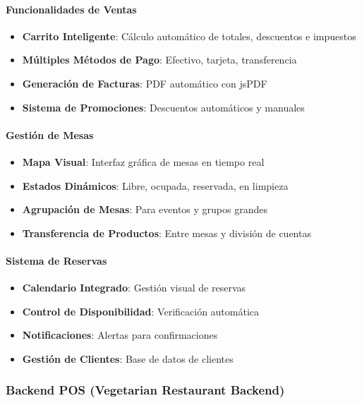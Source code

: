 \documentclass[12pt,a4paper]{article}
\begin{document}
\paragraph{Funcionalidades de Ventas}
\begin{itemize}
    \item \textbf{Carrito Inteligente}: Cálculo automático de totales, descuentos e impuestos
    \item \textbf{Múltiples Métodos de Pago}: Efectivo, tarjeta, transferencia
    \item \textbf{Generación de Facturas}: PDF automático con jsPDF
    \item \textbf{Sistema de Promociones}: Descuentos automáticos y manuales
\end{itemize}

\paragraph{Gestión de Mesas}
\begin{itemize}
    \item \textbf{Mapa Visual}: Interfaz gráfica de mesas en tiempo real
    \item \textbf{Estados Dinámicos}: Libre, ocupada, reservada, en limpieza
    \item \textbf{Agrupación de Mesas}: Para eventos y grupos grandes
    \item \textbf{Transferencia de Productos}: Entre mesas y división de cuentas
\end{itemize}

\paragraph{Sistema de Reservas}
\begin{itemize}
    \item \textbf{Calendario Integrado}: Gestión visual de reservas
    \item \textbf{Control de Disponibilidad}: Verificación automática
    \item \textbf{Notificaciones}: Alertas para confirmaciones
    \item \textbf{Gestión de Clientes}: Base de datos de clientes
\end{itemize}

\subsubsection{Backend POS (Vegetarian Restaurant Backend)}
\end{document}
